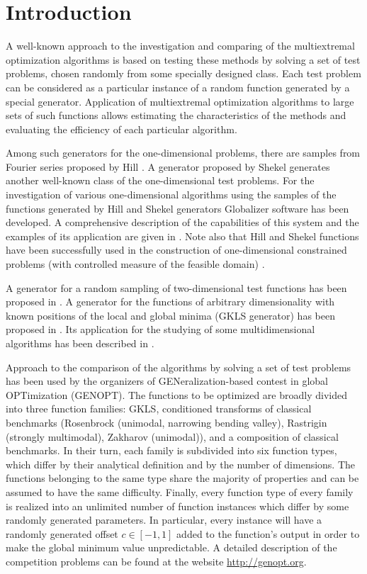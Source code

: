 \documentclass{llncs}
\begin{document}
\section{Introduction}
A well-known approach to the investigation and comparing of the multiextremal optimization algorithms is based on testing these methods by solving a set of test problems, chosen randomly from some specially designed class. Each test problem can be considered as a particular instance of a random function generated by a special generator. Application of multiextremal optimization algorithms to large sets of such functions allows estimating the characteristics of the methods and evaluating the efficiency of each particular algorithm.

Among such generators for the one-dimensional problems, there are samples from Fourier series proposed by Hill \cite{Hill}. A generator proposed by Shekel \cite{Shekel} generates another well-known class of the one-dimensional test problems. For the investigation of various one-dimensional algorithms using the samples of the functions generated by Hill and Shekel generators Globalizer software has been developed. A comprehensive description of the capabilities of this system and the examples of its application are given in \cite{Strongin2000}. Note also that Hill and Shekel functions have been successfully used in the construction of one-dimensional constrained problems (with controlled measure of the feasible domain) \cite{Barkalov2002}. 

A generator for a random sampling of two-dimensional test functions has been proposed in \cite{Grishagin1978}. A generator for the functions of arbitrary dimensionality with known positions of the local and global minima (GKLS generator) has been proposed in \cite{Gaviano}. Its application for the studying of some multidimensional algorithms has been described in \cite{Kvasov2003,Sergeyev2013}.

Approach to the comparison of the algorithms by solving a set of test problems has been used by the organizers of GENeralization-based contest in global OPTimization (GENOPT). The functions to be optimized are broadly divided into three function families: GKLS, conditioned transforms of classical benchmarks (Rosenbrock (unimodal, narrowing bending valley), Rastrigin (strongly multimodal), Zakharov (unimodal)), and a composition of classical benchmarks. In their turn, each family is subdivided into six function types, which differ by their analytical definition and by the number of dimensions. The functions belonging to the same type share the majority of properties and can be assumed to have the same difficulty. Finally, every function type of every family is realized into an unlimited number of function instances which differ by some randomly generated parameters. In particular, every instance will have a randomly generated offset $c\in[-1,1]$ added to the function’s output in order to make the global minimum value unpredictable. A detailed description of the competition problems can be found at the website \url{http://genopt.org}.
\end{document}
